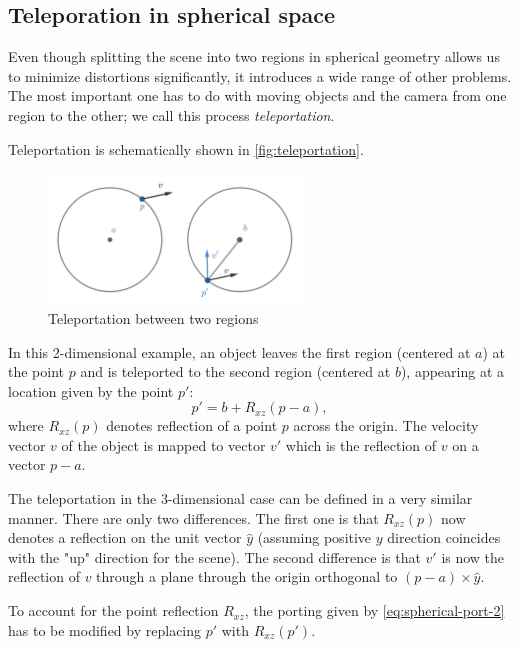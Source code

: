 \subsection{Teleporation in spherical space} \label{sub:teleportation}
Even though splitting the scene into two regions in spherical geometry allows us to minimize distortions significantly, it introduces a wide range of other problems.
The most important one has to do with moving objects and the camera from one region to the other; we call this process \textit{teleportation}.

Teleportation is schematically shown in \autoref{fig:teleportation}.
\begin{figure}[h]
    \centering
    \includegraphics[width=0.6\textwidth]{chapters/theoretical_foundations/sections/non-eudlidean-spaces/resources/teleportation.png}
    \caption{Teleportation between two regions}
    \label{fig:teleportation}
\end{figure}
In this 2-dimensional example, an object leaves the first region (centered at $a$) at the point $p$ and is teleported to the second region (centered at $b$), appearing at a location given by the point $p'$:
\begin{equation*}
    p' = b + R_{xz}(p - a),
\end{equation*}
where $R_{xz}(p)$ denotes reflection of a point $p$ across the origin.
The velocity vector $v$ of the object is mapped to vector $v'$ which is the reflection of $v$ on a vector $p - a$.

The teleportation in the 3-dimensional case can be defined in a very similar manner.
There are only two differences.
The first one is that $R_{xz}(p)$ now denotes a reflection on the unit vector $\hat{y}$ (assuming positive $y$ direction coincides with the "up" direction for the scene).
The second difference is that $v'$ is now the reflection of $v$ through a plane through the origin orthogonal to $(p - a) \times \hat{y}$.

To account for the point reflection $R_{xz}$, the porting given by \autoref{eq:spherical-port-2} has to be modified by replacing $p'$ with $R_{xz}(p')$.

